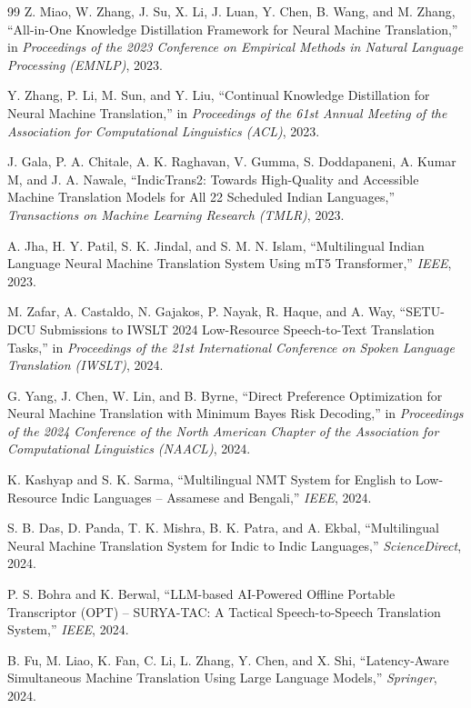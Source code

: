 {\begin{thebibliography}{99}
Z. Miao, W. Zhang, J. Su, X. Li, J. Luan, Y. Chen, B. Wang, and M. Zhang,
``All-in-One Knowledge Distillation Framework for Neural Machine Translation,''
in \textit{Proceedings of the 2023 Conference on Empirical Methods in Natural
Language Processing (EMNLP)}, 2023.

Y. Zhang, P. Li, M. Sun, and Y. Liu, ``Continual Knowledge Distillation for
Neural Machine Translation,'' in \textit{Proceedings of the 61st Annual Meeting
of the Association for Computational Linguistics (ACL)}, 2023.

J. Gala, P. A. Chitale, A. K. Raghavan, V. Gumma, S. Doddapaneni, A. Kumar M,
and J. A. Nawale, ``IndicTrans2: Towards High-Quality and Accessible Machine
Translation Models for All 22 Scheduled Indian Languages,''
\textit{Transactions on Machine Learning Research (TMLR)}, 2023.

A. Jha, H. Y. Patil, S. K. Jindal, and S. M. N. Islam, ``Multilingual Indian
Language Neural Machine Translation System Using mT5 Transformer,''
\textit{IEEE}, 2023.

M. Zafar, A. Castaldo, N. Gajakos, P. Nayak, R. Haque, and A. Way, ``SETU-DCU
Submissions to IWSLT 2024 Low-Resource Speech-to-Text Translation Tasks,'' in
\textit{Proceedings of the 21st International Conference on Spoken Language
Translation (IWSLT)}, 2024.

G. Yang, J. Chen, W. Lin, and B. Byrne, ``Direct Preference Optimization for
Neural Machine Translation with Minimum Bayes Risk Decoding,'' in
\textit{Proceedings of the 2024 Conference of the North American Chapter of the
Association for Computational Linguistics (NAACL)}, 2024.

K. Kashyap and S. K. Sarma, ``Multilingual NMT System for English to
Low-Resource Indic Languages -- Assamese and Bengali,'' \textit{IEEE}, 2024.

S. B. Das, D. Panda, T. K. Mishra, B. K. Patra, and A. Ekbal, ``Multilingual
Neural Machine Translation System for Indic to Indic Languages,''
\textit{ScienceDirect}, 2024.

P. S. Bohra and K. Berwal, ``LLM-based AI-Powered Offline Portable Transcriptor
(OPT) -- SURYA-TAC: A Tactical Speech-to-Speech Translation System,''
\textit{IEEE}, 2024.

B. Fu, M. Liao, K. Fan, C. Li, L. Zhang, Y. Chen, and X. Shi, ``Latency-Aware
Simultaneous Machine Translation Using Large Language Models,''
\textit{Springer}, 2024.


\end{thebibliography}}

